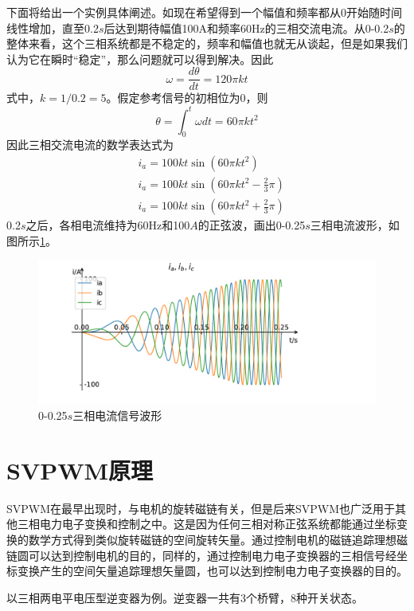 \documentclass{ctexart}
\numberwithin{equation}{section}
\begin{document}
下面将给出一个实例具体阐述。如现在希望得到一个幅值和频率都从0开始随时间线性增加，直至0.2$s$后达到期待幅值100A和频率60Hz的三相交流电流。从0-0.2$s$的整体来看，这个三相系统都是不稳定的，频率和幅值也就无从谈起，但是如果我们认为它在瞬时“稳定”，那么问题就可以得到解决。因此
\begin{equation}
  \omega = \frac{d\theta}{dt} = 120\pi kt
\end{equation}
式中，$ k = 1/0.2 = 5 $。假定参考信号的初相位为0，则
\begin{equation}
  \theta = \int_0^{t} \omega dt = 60\pi kt^2
\end{equation}
因此三相交流电流的数学表达式为
\begin{equation}
  \begin{aligned}
  	&i_a = 100kt\sin (60\pi kt^2 )\\
  	&i_a = 100kt\sin (60\pi kt^2 -\frac{2}{3}\pi )\\
  	&i_a = 100kt\sin (60\pi kt^2 + \frac{2}{3}\pi )
  \end{aligned}
\end{equation}
0.2$ s $之后，各相电流维持为60Hz和100$ A $的正弦波，画出0-0.25$ s $三相电流波形，如图所示\ref{kw-kA-sine-wave}。

\begin{figure}[hbt]
  \centering
  \includegraphics[width = .8\linewidth ]{sin_wave_kA_kw}
  \caption{0-0.25$ s $三相电流信号波形}
  \label{kw-kA-sine-wave}
\end{figure}

\section{SVPWM原理}
SVPWM在最早出现时，与电机的旋转磁链有关，但是后来SVPWM也广泛用于其他三相电力电子变换和控制之中。这是因为任何三相对称正弦系统都能通过坐标变换的数学方式得到类似旋转磁链的空间旋转矢量。通过控制电机的磁链追踪理想磁链圆可以达到控制电机的目的，同样的，通过控制电力电子变换器的三相信号经坐标变换产生的空间矢量追踪理想矢量圆，也可以达到控制电力电子变换器的目的。

以三相两电平电压型逆变器为例。逆变器一共有3个桥臂，8种开关状态。

  
\end{document}
